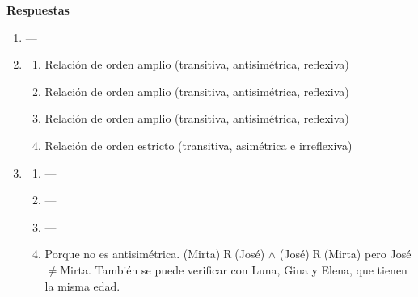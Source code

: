 \documentclass[a4paper]{article}
\newcommand{\exercise}{\item}
\begin{document}
 \textbf{Respuestas}\begin{enumerate}\exercise---\exercise\begin{enumerate} [label=(\alph*)]		\item Relación de orden amplio (transitiva, antisimétrica, reflexiva) 
		\item Relación de orden amplio (transitiva, antisimétrica, reflexiva)
		\item Relación de orden amplio (transitiva, antisimétrica, reflexiva)
		\item Relación de orden estricto (transitiva, asimétrica e irreflexiva)
\end{enumerate}\exercise\begin{enumerate} [label=(\alph*)]\item ---\item ---\item ---		\item Porque no es antisimétrica. (Mirta)$\mathrel{R}$(José) $\land$ (José)$\mathrel{R}$(Mirta) pero José$\neq$Mirta. También se puede verificar con Luna, Gina y Elena, que tienen la misma edad.
\end{enumerate}\end{enumerate}
\end{document}
